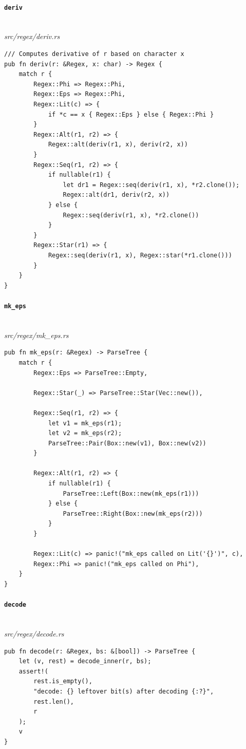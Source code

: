 \paragraph{\texttt{deriv}}\ \\[-0.4em]
\textit{\small src/regex/deriv.rs}
{\scriptsize\begin{verbatim}
/// Computes derivative of r based on character x
pub fn deriv(r: &Regex, x: char) -> Regex {
    match r {
        Regex::Phi => Regex::Phi,
        Regex::Eps => Regex::Phi,
        Regex::Lit(c) => {
            if *c == x { Regex::Eps } else { Regex::Phi }
        }
        Regex::Alt(r1, r2) => {
            Regex::alt(deriv(r1, x), deriv(r2, x))
        }
        Regex::Seq(r1, r2) => {
            if nullable(r1) {
                let dr1 = Regex::seq(deriv(r1, x), *r2.clone());
                Regex::alt(dr1, deriv(r2, x))
            } else {
                Regex::seq(deriv(r1, x), *r2.clone())
            }
        }
        Regex::Star(r1) => {
            Regex::seq(deriv(r1, x), Regex::star(*r1.clone()))
        }
    }
}
\end{verbatim}}

\paragraph{\texttt{mk\_eps}}\ \\[-0.4em]
\textit{\small src/regex/mk\_eps.rs}
{\scriptsize\begin{verbatim}
pub fn mk_eps(r: &Regex) -> ParseTree {
    match r {
        Regex::Eps => ParseTree::Empty,
        
        Regex::Star(_) => ParseTree::Star(Vec::new()),
        
        Regex::Seq(r1, r2) => {
            let v1 = mk_eps(r1);
            let v2 = mk_eps(r2);
            ParseTree::Pair(Box::new(v1), Box::new(v2))
        }
        
        Regex::Alt(r1, r2) => {
            if nullable(r1) {
                ParseTree::Left(Box::new(mk_eps(r1)))
            } else {
                ParseTree::Right(Box::new(mk_eps(r2)))
            }
        }
        
        Regex::Lit(c) => panic!("mk_eps called on Lit('{}')", c),
        Regex::Phi => panic!("mk_eps called on Phi"),
    }
}
\end{verbatim}}

\paragraph{\texttt{decode}}\ \\[-0.4em]
\textit{\small src/regex/decode.rs}
{\scriptsize\begin{verbatim}
pub fn decode(r: &Regex, bs: &[bool]) -> ParseTree {
    let (v, rest) = decode_inner(r, bs);
    assert!(
        rest.is_empty(),
        "decode: {} leftover bit(s) after decoding {:?}",
        rest.len(),
        r
    );
    v
}
\end{verbatim}}

